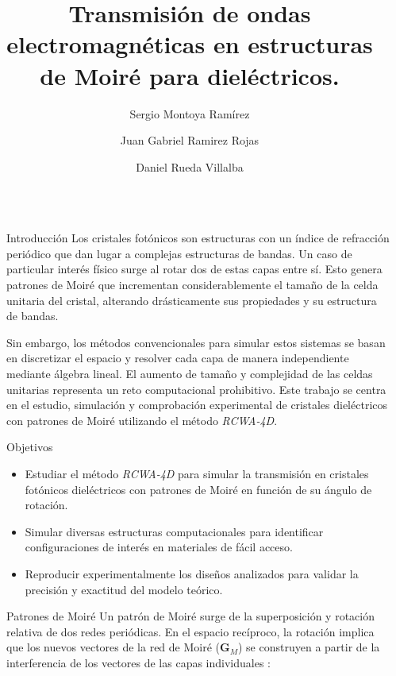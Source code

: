 \documentclass[final]{beamer}
\title{Transmisión de ondas electromagnéticas en estructuras de Moiré para dieléctricos.}
\author{Sergio Montoya Ramírez \and Juan Gabriel Ramirez Rojas \and Daniel Rueda Villalba\inst{1}}
\institute[shortinst]{\inst{1} Universidad de los Andes}
\newlength{\sepwidth}
\newlength{\colwidth}
\newcommand{\separatorcolumn}{\begin{column}{\sepwidth}\end{column}}
\begin{document}
  \begin{frame}[t]
    \begin{columns}[t]
      \separatorcolumn

      \begin{column}{\colwidth}

        \begin{block}{Introducción}
          Los cristales fotónicos son estructuras con un índice de refracción periódico que dan lugar a complejas estructuras de bandas. Un caso de particular interés físico surge al rotar dos de estas capas entre sí. Esto genera patrones de Moiré que incrementan considerablemente el tamaño de la celda unitaria del cristal, alterando drásticamente sus propiedades y su estructura de bandas.

          Sin embargo, los métodos convencionales para simular estos sistemas se basan en discretizar el espacio y resolver cada capa de manera independiente mediante álgebra lineal. El aumento de tamaño y complejidad de las celdas unitarias representa un reto computacional prohibitivo. Este trabajo se centra en el estudio, simulación y comprobación experimental de cristales dieléctricos con patrones de Moiré utilizando el método \textit{RCWA-4D}.
        \end{block}


        \begin{block}{Objetivos}
          \begin{itemize}
            \item Estudiar el método \textit{RCWA-4D} para simular la transmisión en cristales fotónicos dieléctricos con patrones de Moiré en función de su ángulo de rotación.
            \item Simular diversas estructuras computacionales para identificar configuraciones de interés en materiales de fácil acceso.
            \item Reproducir experimentalmente los diseños analizados para validar la precisión y exactitud del modelo teórico.
          \end{itemize}
        \end{block}

        \begin{block}{Patrones de Moiré}
          Un patrón de Moiré surge de la superposición y rotación relativa de dos redes periódicas. En el espacio recíproco, la rotación implica que los nuevos vectores de la red de Moiré ($\mathbf{G}_M$) se construyen a partir de la interferencia de los vectores de las capas individuales \cite{lou2025rcwa4d}:


\end{block}
\end{column}
\end{columns}
\end{frame}
\end{document}
